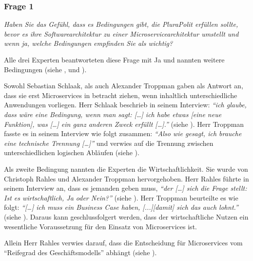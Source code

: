 \subsubsection{Frage 1}
\label{sec:frage1}

\textit{Haben Sie das Gefühl, dass es Bedingungen gibt, die PluraPolit erfüllen sollte, bevor es ihre Softwarearchitektur zu einer Microservicearchitektur umstellt und wenn ja, welche Bedingungen empfinden Sie als wichtig?}

Alle drei Experten beantworteten diese Frage mit Ja und nannten weitere Bedingungen (siehe ,  und ).

Sowohl Sebastian Schlaak, als auch Alexander Troppman gaben als Antwort an, dass sie erst Microservices in betracht ziehen, wenn inhaltlich unterschiedliche Anwendungen vorliegen. Herr Schlaak beschrieb in seinem Interview: \textit{\enquote{ich glaube, dass wäre eine Bedingung, wenn man sagt: […] ich habe etwas [eine neue Funktion], was […] ein ganz anderen Zweck erfüllt […].}} (siehe ). Herr Troppman fasste es in seinem Interview wie folgt zusammen:  \textit{\enquote{Also wie gesagt, ich brauche eine technische Trennung […]}} und verwies auf die Trennung zwischen unterschiedlichen logischen Abläufen (siehe ).

Als zweite Bedingung nannten die Experten die Wirtschaftlichkeit. Sie wurde  von Christoph Rahles und Alexander Troppman hervorgehoben. Herr Rahles führte in seinem Interview an, dass es jemanden geben muss, \textit{\enquote{der […] sich die Frage stellt: Ist es wirtschaftlich, Ja oder Nein?}} (siehe ). Herr Troppman beurteilte es wie folgt: \textit{\enquote{[…] ich muss ein Business Case haben, [...][damit] sich das auch lohnt.}} (siehe ). Daraus kann geschlussfolgert werden, dass der wirtschaftliche Nutzen ein wesentliche Voraussetzung für den Einsatz von Microservices ist.

Allein Herr Rahles verwies darauf, dass die Entscheidung für Microservices vom “Reifegrad des Geschäftsmodells” abhängt (siehe ).

